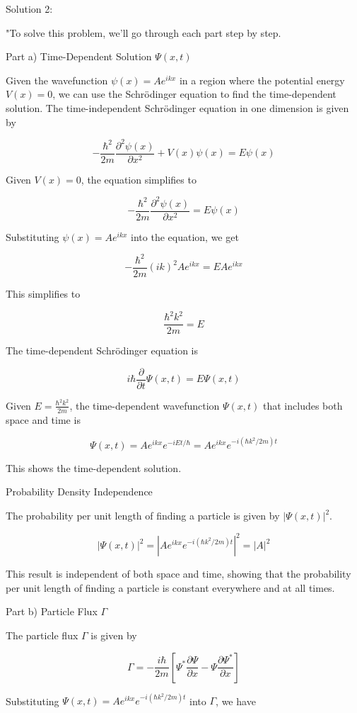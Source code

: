 Solution 2:

"To solve this problem, we'll go through each part step by step.

Part a) Time-Dependent Solution \( \Psi(x,t) \)

Given the wavefunction \( \psi(x) = Ae^{ikx} \) in a region where the potential energy \( V(x) = 0 \), we can use the Schrödinger equation to find the time-dependent solution. The time-independent Schrödinger equation in one dimension is given by

\[
-\frac{\hbar^2}{2m} \frac{\partial^2 \psi(x)}{\partial x^2} + V(x)\psi(x) = E\psi(x)
\]

Given \( V(x) = 0 \), the equation simplifies to

\[
-\frac{\hbar^2}{2m} \frac{\partial^2 \psi(x)}{\partial x^2} = E\psi(x)
\]

Substituting \( \psi(x) = Ae^{ikx} \) into the equation, we get

\[
-\frac{\hbar^2}{2m} (ik)^2 Ae^{ikx} = EAe^{ikx}
\]

This simplifies to

\[
\frac{\hbar^2k^2}{2m} = E
\]

The time-dependent Schrödinger equation is

\[
i\hbar \frac{\partial}{\partial t} \Psi(x,t) = E\Psi(x,t)
\]

Given \( E = \frac{\hbar^2k^2}{2m} \), the time-dependent wavefunction \( \Psi(x,t) \) that includes both space and time is

\[
\Psi(x,t) = Ae^{ikx}e^{-iEt/\hbar} = Ae^{ikx}e^{-i(\hbar k^2/2m)t}
\]

This shows the time-dependent solution.

Probability Density Independence

The probability per unit length of finding a particle is given by \( |\Psi(x,t)|^2 \).

\[
|\Psi(x,t)|^2 = |Ae^{ikx}e^{-i(\hbar k^2/2m)t}|^2 = |A|^2
\]

This result is independent of both space and time, showing that the probability per unit length of finding a particle is constant everywhere and at all times.

Part b) Particle Flux \( \Gamma \)

The particle flux \( \Gamma \) is given by

\[
\Gamma = -\frac{i\hbar}{2m}\left[ \Psi^{*}\frac{\partial\Psi}{\partial x} - \Psi\frac{\partial\Psi^{*}}{\partial x} \right]
\]

Substituting \( \Psi(x,t) = Ae^{ikx}e^{-i(\hbar k^2/2m)t} \) into \( \Gamma \), we have

